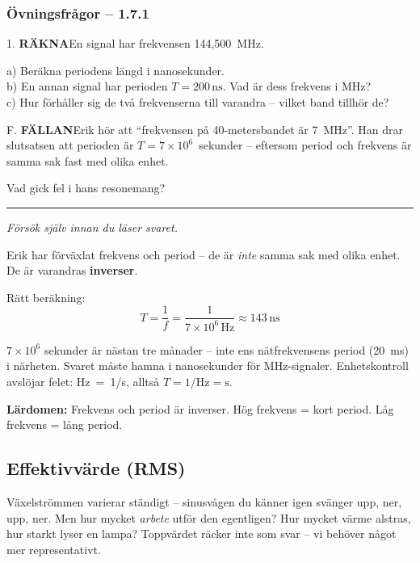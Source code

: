 \documentclass[a4paper,11pt,twoside]{book}
\newcommand{\qrakna}{\colorbox{bluepale}{\textcolor{bluedark}{\headingfont\bfseries\tiny RÄKNA}}}
\newcommand{\qfallan}{\colorbox{ljusbrun}{\textcolor{kakao}{\headingfont\bfseries\tiny FÄLLAN}}}
\begin{document}
\subsubsection*{Övningsfrågor -- 1.7.1}

\begin{qblock}{1.}
\qrakna\quad En signal har frekvensen 144,500~MHz.

a) Beräkna periodens längd i nanosekunder.\\
b) En annan signal har perioden $T = 200\,\text{ns}$.
Vad är dess frekvens i MHz?\\
c) Hur förhåller sig de två frekvenserna till
varandra -- vilket band tillhör de?
\end{qblock}

\begin{qblock}{F.}
\qfallan\quad Erik hör att ``frekvensen på 40-metersbandet
är 7~MHz''. Han drar slutsatsen att perioden är
$T = 7 \times 10^6$~sekunder -- eftersom period och
frekvens är samma sak fast med olika enhet.

Vad gick fel i hans resonemang?
\end{qblock}

\medskip
\noindent\rule{\textwidth}{0.4pt}
{\small\itshape Försök själv innan du läser svaret.}
\medskip

\begin{worked}[title={Lösning -- Fallgropsfråga 1.7.1\,F}]
Erik har förväxlat frekvens och period -- de är
\emph{inte} samma sak med olika enhet. De är
varandras \textbf{inverser}.

Rätt beräkning:
\[ T = \frac{1}{f} = \frac{1}{7 \times 10^6\,\text{Hz}} \approx 143\,\text{ns} \]

$7 \times 10^6$ sekunder är nästan tre månader --
inte ens nätfrekvensens period (20~ms) i närheten.
Svaret måste hamna i nanosekunder för MHz-signaler.
Enhetskontroll avslöjar felet:
Hz~=~1/s, alltså $T = 1/\text{Hz} = \text{s}$.

\textbf{Lärdomen:} Frekvens och period är inverser.
Hög frekvens = kort period. Låg frekvens = lång period.
\end{worked}


\subsection{Effektivvärde (RMS)}

Växelströmmen varierar ständigt -- sinusvågen du
känner igen svänger upp, ner, upp, ner. Men hur
mycket \emph{arbete} utför den egentligen? Hur mycket
värme alstras, hur starkt lyser en lampa? Toppvärdet
räcker inte som svar -- vi behöver något mer
representativt.
\end{document}
